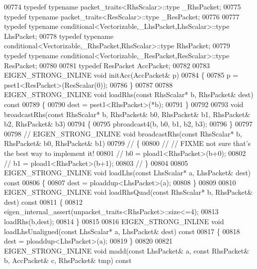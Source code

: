 \begin{DoxyCode}
00774   \textcolor{keyword}{typedef} \textcolor{keyword}{typename} packet\_traits<RhsScalar>::type  \_RhsPacket;
00775   \textcolor{keyword}{typedef} \textcolor{keyword}{typename} packet\_traits<ResScalar>::type  \_ResPacket;
00776 
00777   \textcolor{keyword}{typedef} \textcolor{keyword}{typename} conditional<Vectorizable,\_LhsPacket,LhsScalar>::type LhsPacket;
00778   \textcolor{keyword}{typedef} \textcolor{keyword}{typename} conditional<Vectorizable,\_RhsPacket,RhsScalar>::type RhsPacket;
00779   \textcolor{keyword}{typedef} \textcolor{keyword}{typename} conditional<Vectorizable,\_ResPacket,ResScalar>::type ResPacket;
00780 
00781   \textcolor{keyword}{typedef} ResPacket AccPacket;
00782 
00783   EIGEN\_STRONG\_INLINE \textcolor{keywordtype}{void} initAcc(AccPacket& p)
00784   \{
00785     p = pset1<ResPacket>(ResScalar(0));
00786   \}
00787 
00788   EIGEN\_STRONG\_INLINE \textcolor{keywordtype}{void} loadRhs(\textcolor{keyword}{const} RhsScalar* b, RhsPacket& dest)\textcolor{keyword}{ const}
00789 \textcolor{keyword}{  }\{
00790     dest = pset1<RhsPacket>(*b);
00791   \}
00792   
00793   \textcolor{keywordtype}{void} broadcastRhs(\textcolor{keyword}{const} RhsScalar* b, RhsPacket& b0, RhsPacket& b1, RhsPacket& b2, RhsPacket& b3)
00794   \{
00795     pbroadcast4(b, b0, b1, b2, b3);
00796   \}
00797   
00798 \textcolor{comment}{//   EIGEN\_STRONG\_INLINE void broadcastRhs(const RhsScalar* b, RhsPacket& b0, RhsPacket& b1)}
00799 \textcolor{comment}{//   \{}
00800 \textcolor{comment}{//     // FIXME not sure that's the best way to implement it!}
00801 \textcolor{comment}{//     b0 = pload1<RhsPacket>(b+0);}
00802 \textcolor{comment}{//     b1 = pload1<RhsPacket>(b+1);}
00803 \textcolor{comment}{//   \}}
00804 
00805   EIGEN\_STRONG\_INLINE \textcolor{keywordtype}{void} loadLhs(\textcolor{keyword}{const} LhsScalar* a, LhsPacket& dest)\textcolor{keyword}{ const}
00806 \textcolor{keyword}{  }\{
00807     dest = ploaddup<LhsPacket>(a);
00808   \}
00809   
00810   EIGEN\_STRONG\_INLINE \textcolor{keywordtype}{void} loadRhsQuad(\textcolor{keyword}{const} RhsScalar* b, RhsPacket& dest)\textcolor{keyword}{ const}
00811 \textcolor{keyword}{  }\{
00812     eigen\_internal\_assert(unpacket\_traits<RhsPacket>::size<=4);
00813     loadRhs(b,dest);
00814   \}
00815 
00816   EIGEN\_STRONG\_INLINE \textcolor{keywordtype}{void} loadLhsUnaligned(\textcolor{keyword}{const} LhsScalar* a, LhsPacket& dest)\textcolor{keyword}{ const}
00817 \textcolor{keyword}{  }\{
00818     dest = ploaddup<LhsPacket>(a);
00819   \}
00820 
00821   EIGEN\_STRONG\_INLINE \textcolor{keywordtype}{void} madd(\textcolor{keyword}{const} LhsPacket& a, \textcolor{keyword}{const} RhsPacket& b, AccPacket& c, RhsPacket& tmp)\textcolor{keyword}{ const}

\end{DoxyCode}

